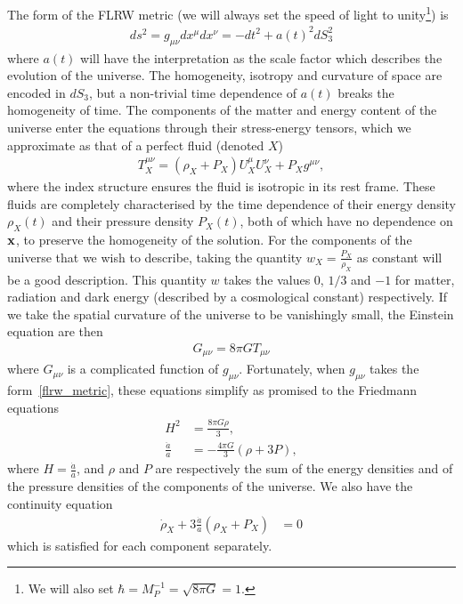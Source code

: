     The form of the FLRW metric (we will always set the speed of light to unity\footnote{
        We will also set $\hbar=M_P^{-1}=\sqrt{8\pi G}=1$.
    }) is
    \begin{align}\label{flrw_metric}
        ds^2 = g_{\mu\nu}dx^{\mu}dx^{\nu} = - dt^2 + a(t)^2 dS_3^2
    \end{align}
    where $a(t)$ will have the interpretation as the scale factor
    which describes the evolution of the universe.
    The homogeneity, isotropy and curvature of space are encoded in $dS_3$,
    but a non-trivial time dependence of $a(t)$ breaks the homogeneity of time.
    The components of the matter and energy content of the universe enter the equations through
    their stress-energy tensors, which we approximate as that of
    a perfect fluid (denoted $X$)
    \begin{align}
        T_X^{\mu\nu} = (\rho_X+P_X)U_X^\mu U_X^\nu+P_Xg^{\mu\nu},
    \end{align}
    where the index structure ensures the fluid is isotropic in its rest frame.
    These fluids are completely characterised by the time dependence
    of their energy density $\rho_X(t)$ and their pressure density $P_X(t)$,
    both of which have no dependence on $\mathbf{x}$, to preserve the homogeneity of the solution.
    For the components of the universe that we wish to describe,
    taking the quantity $w_X=\frac{P_X}{\rho_X}$ as constant will be a good description.
    This quantity $w$ takes the values $0$, $1/3$ and $-1$ for matter, radiation
    and dark energy (described by a cosmological constant) respectively.
    If we take the spatial curvature of the universe to be vanishingly small,
    the Einstein equation are then
    \begin{align}\label{einstein_equations}
        G_{\mu\nu} = 8\pi G T_{\mu\nu}
    \end{align}
    where $G_{\mu\nu}$ is a complicated function of $g_{\mu\nu}$.
    Fortunately, when $g_{\mu\nu}$ takes the form~\eqref{flrw_metric},
    these equations simplify as promised to the Friedmann equations
    \begin{align}\label{friedmann_1}
        H^2 &= \frac{8\pi G \rho}{3},\\
        \frac{\ddot{a}}{a} &= -\frac{4\pi G}{3}\left(\rho+3P\right),
    \end{align}
    where $H=\frac{\dot{a}}{a}$, and $\rho$ and $P$ are respectively the sum of the
    energy densities and of the pressure densities of the
    components of the universe. We also have the continuity equation
    \begin{align}\label{continuity_equation}
        \dot{\rho}_X + 3\frac{\dot{a}}{a}\left(\rho_X+P_X\right) &= 0
    \end{align}
    which is satisfied for each component separately.

